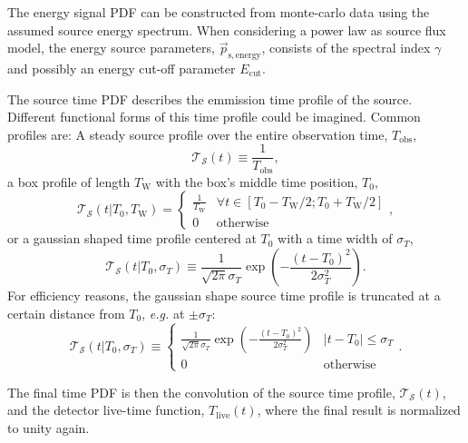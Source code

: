 \documentclass{article}
\begin{document}
The energy signal PDF can be constructed from monte-carlo data using the assumed
source energy spectrum.
When considering a power law as source flux model, the energy source parameters,
$\vec{p}_{\mathrm{s,energy}}$, consists of the spectral index $\gamma$ and possibly
an energy cut-off parameter $E_{\mathrm{cut}}$.

The source time PDF describes the emmission time profile of the source. Different
functional forms of this time profile could be imagined. Common profiles are:
A steady source profile over the entire observation time, $T_{\mathrm{obs}}$,
\begin{equation}
 \mathcal{T}_{\mathcal{S}}(t) \equiv \frac{1}{T_{\mathrm{obs}}},
\end{equation}
a box profile of length $T_{\mathrm{W}}$ with the box's middle time position, $T_{0}$,
\begin{equation}
 \mathcal{T}_{\mathcal{S}}(t|T_0,T_{\mathrm{W}}) = \begin{cases}
                                 \frac{1}{T_{\mathrm{W}}} & \forall t \in \left[T_0 - T_{\mathrm{W}}/2; T_0 + T_{\mathrm{W}}/2 \right]\\
                                 0 & \mathrm{otherwise}
                                 \end{cases},
\end{equation}
or a gaussian shaped time profile centered at $T_0$ with a time width of $\sigma_T$,
\begin{equation}
 \mathcal{T}_{\mathcal{S}}(t|T_0,\sigma_T) \equiv \frac{1}{\sqrt{2\pi}\sigma_T}\exp\left(-\frac{(t - T_0)^2}{2\sigma_T^2}\right).
\end{equation}
For efficiency reasons, the gaussian shape source time profile is truncated at
a certain distance from $T_0$, \emph{e.g.} at $\pm\sigma_T$:
\begin{equation}
 \mathcal{T}_{\mathcal{S}}(t|T_0,\sigma_T) \equiv \begin{cases}
                                      \frac{1}{\sqrt{2\pi}\sigma_T}\exp\left(-\frac{(t - T_0)^2}{2\sigma_T^2}\right) & \left|t-T_0\right| \le \sigma_T\\
                                      0 & \mathrm{otherwise}
                                     \end{cases}.
\end{equation}


The final time PDF is then the convolution of the source time profile,
$\mathcal{T}_{\mathcal{S}}(t)$, and the detector live-time function,
$T_{\mathrm{live}}(t)$, where the final result is normalized to unity again.
\end{document}
